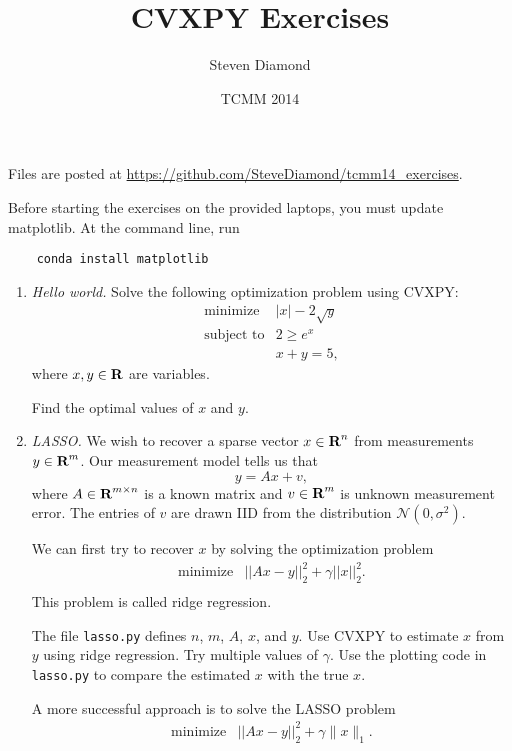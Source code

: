 \documentclass[12pt]{article}
\title{CVXPY Exercises}
\author{Steven Diamond}
\date{TCMM 2014}
\begin{document}
\maketitle

Files are posted at \url{https://github.com/SteveDiamond/tcmm14_exercises}.

Before starting the exercises on the provided laptops, you must update matplotlib. At the command line, run
\begin{verbatim}
    conda install matplotlib
\end{verbatim}

\begin{enumerate}
\item\emph{Hello world.}
Solve the following optimization problem using CVXPY:
\[
\begin{array}{ll} \mbox{minimize} & |x| - 2\sqrt{y}\\
\mbox{subject to} & 2 \geq e^x \\
& x + y = 5,
\end{array}
\]
where $x,y \in {\mbox{\bf R}}$ are variables.

Find the optimal values of $x$ and $y$.

\item\emph{LASSO.}
We wish to recover a sparse vector $x \in {\mbox{\bf R}}^n$ from measurements $y \in {\mbox{\bf R}}^m$. Our measurement model tells us that
$$
y = Ax + v,
$$
where $A \in {\mbox{\bf R}}^{m \times n}$ is a known matrix and $v \in {\mbox{\bf R}}^m$ is unknown measurement error. The entries of $v$ are drawn IID from the distribution $\mathcal{N}(0, \sigma^2)$.

We can first try to recover $x$ by solving the optimization problem
\[
\begin{array}{ll} \mbox{minimize} & ||Ax - y||^2_2 + \gamma ||x||^2_2.\\
\end{array}
\]
This problem is called ridge regression.

The file \verb+lasso.py+ defines $n$, $m$, $A$, $x$, and $y$. Use CVXPY to estimate $x$ from $y$ using ridge regression. Try multiple values of $\gamma$. Use the plotting code in \verb+lasso.py+ to compare the estimated $x$ with the true $x$.

A more successful approach is to solve the LASSO problem
\[
\begin{array}{ll} \mbox{minimize} & ||Ax - y||^2_2 + \gamma \|x\|_1.\\
\end{array}
\]


\end{enumerate}
\end{document}
